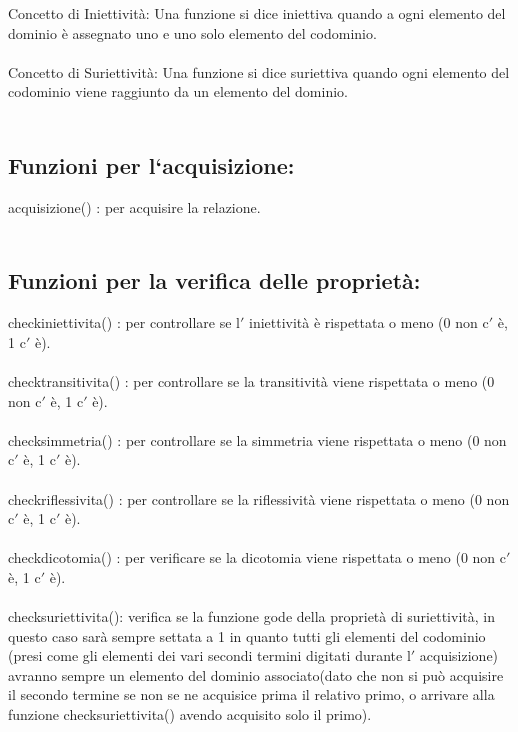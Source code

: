 \documentclass[11pt, a4paper, titlepage, block]{article}
\begin{document}
	Concetto di Iniettivit\`a: Una funzione si dice iniettiva quando a ogni elemento del dominio \`e assegnato uno e uno solo elemento del codominio.\\
	\\
	Concetto di Suriettivit\`a: Una funzione si dice suriettiva quando ogni elemento del codominio viene raggiunto da un elemento del dominio.\\
	\\
	\newpage        
	\subsection{Funzioni per l`acquisizione:}
	
	acquisizione() : per acquisire la relazione.\\
	\\
	
	\subsection{Funzioni per la verifica delle propriet\`a:}

	check\textunderscore iniettivita() : per controllare se l$'$ iniettivit\`a \`e rispettata o meno (0 non c$'$ \`e, 1 c$'$ \`e).\\
	\\
	check\textunderscore transitivita() : per controllare se la transitivit\`a 
	viene rispettata o meno (0 non c$'$ \`e, 1 c$'$ \`e).\\
	\\
	check\textunderscore simmetria() : per controllare se la simmetria viene rispettata o meno (0 non c$'$ \`e, 1 c$'$ \`e).\\
	\\
	check\textunderscore riflessivita() : per controllare se la riflessivit\`a viene rispettata o meno (0 non c$'$ \`e, 1 c$'$ \`e).\\
	\\
	check\textunderscore dicotomia() : per verificare se la dicotomia viene rispettata o meno (0 non c$'$ \`e, 1 c$'$ \`e).\\
	\\
	check\textunderscore suriettivita(): verifica se la funzione gode della propriet\`a di suriettivit\`a, in questo caso sar\`a sempre settata a 1 in quanto tutti gli elementi del codominio (presi come gli elementi dei vari secondi termini digitati durante l$'$ acquisizione) avranno sempre un elemento del dominio associato(dato che non si pu\`o acquisire il secondo termine se non se ne acquisice prima il relativo primo, o arrivare alla funzione check\textunderscore suriettivita() avendo acquisito solo il primo).\\
	\\
	\newpage
\end{document}
